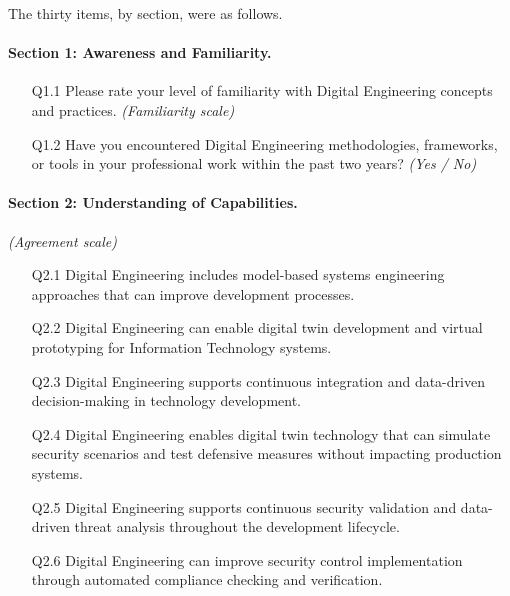   The thirty items, by section, were as follows.

  \paragraph{Section 1: Awareness and Familiarity.}
  \begin{enumerate}[leftmargin=2.4em,itemsep=1pt]
    \item[Q1.1] Please rate your level of familiarity with Digital Engineering concepts and practices. \emph{(Familiarity scale)}
    \item[Q1.2] Have you encountered Digital Engineering methodologies, frameworks, or tools in your professional work within the past two years? \emph{(Yes / No)}
  \end{enumerate}

  \paragraph{Section 2: Understanding of Capabilities.} \emph{(Agreement scale)}
  \begin{enumerate}[leftmargin=2.4em,itemsep=1pt]
    \item[Q2.1] Digital Engineering includes model-based systems engineering approaches that can improve development processes.
    \item[Q2.2] Digital Engineering can enable digital twin development and virtual prototyping for Information Technology systems.
    \item[Q2.3] Digital Engineering supports continuous integration and data-driven decision-making in technology development.
    \item[Q2.4] Digital Engineering enables digital twin technology that can simulate security scenarios and test defensive measures without impacting production systems.
    \item[Q2.5] Digital Engineering supports continuous security validation and data-driven threat analysis throughout the development lifecycle.
    \item[Q2.6] Digital Engineering can improve security control implementation through automated compliance checking and verification.
  \end{enumerate}

